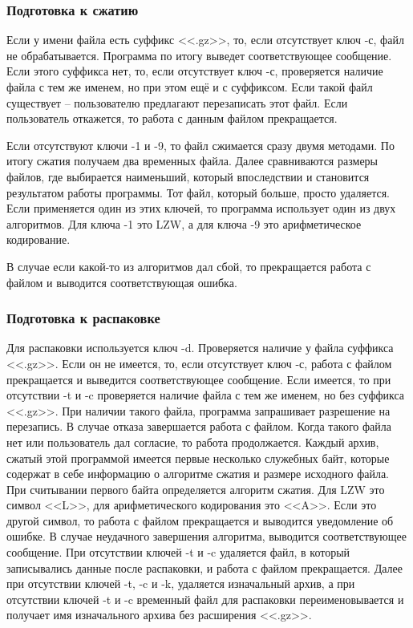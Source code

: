 \documentclass[12pt]{article}
\begin{document}
\subsubsection*{Подготовка к сжатию}

Если у имени файла есть суффикс <<.gz>>, то, если отсутствует ключ -с, файл не обрабатывается. Программа по итогу выведет соответствующее сообщение. Если этого суффикса нет, то, если отсутствует ключ -с, проверяется наличие файла с тем же именем, но при этом ещё и с суффиксом. Если такой файл существует -- пользователю предлагают перезаписать этот файл. Если пользователь откажется, то работа с данным файлом прекращается.

Если отсутствуют ключи -1 и -9, то файл сжимается сразу двумя методами. По итогу сжатия получаем два временных файла. Далее сравниваются размеры файлов, где выбирается наименьший, который впоследствии и становится результатом работы программы. Тот файл, который больше, просто удаляется. Если применяется один из этих ключей, то программа использует один из двух алгоритмов. Для ключа -1 это LZW, а для ключа -9 это арифметическое кодирование.

В случае если какой-то из алгоритмов дал сбой, то прекращается работа с файлом и выводится соответствующая ошибка.

\subsubsection*{Подготовка к распаковке}

Для распаковки используется ключ -d. Проверяется наличие у файла суффикса <<.gz>>. Если он не имеется, то, если отсутствует ключ -с, работа с файлом прекращается и выведится соответствующее сообщение. Если имеется, то при отсутствии -t и -c проверяется наличие файла с тем же именем, но без суффикса <<.gz>>. При наличии такого файла, программа запрашивает разрешение на перезапись. В случае отказа завершается работа с файлом. Когда такого файла нет или пользователь дал согласие, то работа продолжается. Каждый архив, сжатый этой программой имеется первые несколько служебных байт, которые содержат в себе информацию о алгоритме сжатия и размере исходного файла. При считывании первого байта определяется алгоритм сжатия. Для LZW это символ <<L>>, для арифметического кодирования это <<A>>. Если это другой символ, то работа с файлом прекращается и выводится уведомление об ошибке. В случае неудачного завершения алгоритма, выводится соответствующее сообщение. При отсутствии ключей -t и -c удаляется файл, в который записывались данные после распаковки, и работа с файлом прекращается. Далее при отсутствии ключей -t, -c и -k, удаляется изначальный архив, а при отсутствии ключей -t и -c временный файл для распаковки переименовывается и получает имя изначального архива без расширения <<.gz>>.
\end{document}
